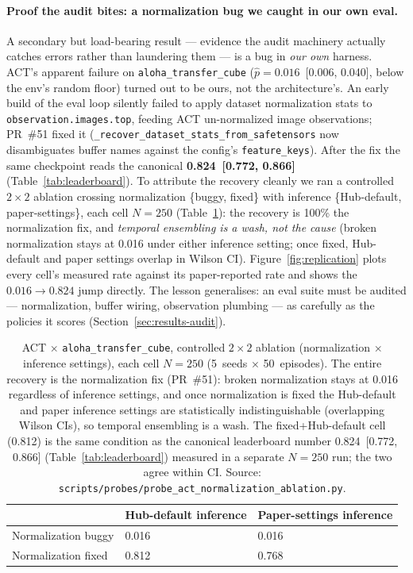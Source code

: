 \documentclass[10pt]{article}
\begin{document}
\paragraph{Proof the audit bites: a normalization bug we caught in our
own eval.}
A secondary but load-bearing result --- evidence the audit machinery
actually catches errors rather than laundering them --- is a bug in
\emph{our own} harness. ACT's apparent failure on
\texttt{aloha\_transfer\_cube} ($\hat{p}{=}0.016$~[0.006, 0.040], below
the env's random floor) turned out to be ours, not the architecture's. An early
build of the eval loop silently failed to apply dataset normalization stats
to \texttt{observation.images.top}, feeding ACT un-normalized image
observations; PR~\#51 fixed it
(\texttt{\_recover\_dataset\_stats\_from\_safetensors} now disambiguates
buffer names against the config's \texttt{feature\_keys}). After the fix the
same checkpoint reads the canonical \textbf{0.824~[0.772, 0.866]}
(Table~\ref{tab:leaderboard}). To attribute the recovery cleanly we ran a
controlled $2{\times}2$ ablation crossing normalization \{buggy, fixed\}
with inference \{Hub-default, paper-settings\}, each cell $N{=}250$
(Table~\ref{tab:act-ablation}): the recovery is 100\% the normalization
fix, and \emph{temporal ensembling is a wash, not the cause} (broken
normalization stays at 0.016 under either inference setting; once fixed,
Hub-default and paper settings overlap in Wilson CI). Figure~\ref{fig:replication}
plots every cell's measured rate against its paper-reported rate and shows
the $0.016\to0.824$ jump directly. The lesson
generalises: an eval suite must be audited --- normalization,
buffer wiring, observation plumbing --- as carefully as the policies it
scores (Section~\ref{sec:results-audit}).

\begin{table}[t]
\centering
\small
\begin{tabular}{lll}
\toprule
& Hub-default inference & Paper-settings inference \\
\midrule
Normalization buggy & 0.016 & 0.016 \\
Normalization fixed & 0.812 & 0.768 \\
\bottomrule
\end{tabular}
\caption{ACT $\times$ \texttt{aloha\_transfer\_cube}, controlled
$2{\times}2$ ablation (normalization $\times$ inference settings), each
cell $N{=}250$ (5~seeds $\times$ 50~episodes). The entire recovery is the
normalization fix (PR~\#51): broken normalization stays at 0.016
regardless of inference settings, and once normalization is fixed the
Hub-default and paper inference settings are statistically
indistinguishable (overlapping Wilson CIs), so temporal ensembling is a
wash. The fixed+Hub-default cell (0.812) is the same condition as the
canonical leaderboard number 0.824~[0.772, 0.866] (Table~\ref{tab:leaderboard})
measured in a separate $N{=}250$ run; the two agree within CI. Source:
\texttt{scripts/probes/probe\_act\_normalization\_ablation.py}.}
\label{tab:act-ablation}
\end{table}
\end{document}
